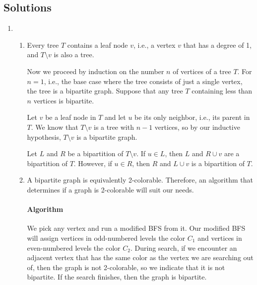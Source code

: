 \documentclass{article}
\begin{document}

\noindent
{}

\subsection*{Solutions}

\begin{enumerate}
%
%
\item
\begin{enumerate}
\item Every tree $T$ contains a leaf node $v$, i.e., a vertex $v$ that has a degree of 1, and $T \setminus v$ is also a tree.

Now we proceed by induction on the number $n$ of vertices of a tree $T$. For $n = 1$, i.e., the base case where the tree consists of just a single vertex, the tree is a bipartite graph. Suppose that any tree $T$ containing less than $n$ vertices is bipartite.

Let $v$ be a leaf node in $T$ and let $u$ be its only neighbor, i.e., its parent in $T$. We know that $T \setminus v$ is a tree with $n - 1$ vertices, so by our inductive hypothesis, $T \setminus v$ is a bipartite graph.

Let $L$ and $R$ be a bipartition of $T \setminus v$. If $u \in L$, then $L$ and $R \cup {v}$ are a bipartition of $T$. However, if $u \in R$, then $R$ and $L \cup {v}$ is a bipartition of $T$.

\item A bipartite graph is equivalently 2-colorable. Therefore, an algorithm that determines if a graph is 2-colorable will suit our needs.

\paragraph{Algorithm}
We pick any vertex and run a modified BFS from it. Our modified BFS will assign vertices in odd-numbered levels the color $C_1$ and vertices in even-numbered levels the color $C_2$. During search, if we encounter an adjacent vertex that has the same color as the vertex we are searching out of, then the graph is not 2-colorable, so we indicate that it is not bipartite. If the search finishes, then the graph is bipartite.


\end{enumerate}
\end{enumerate}
\end{document}
